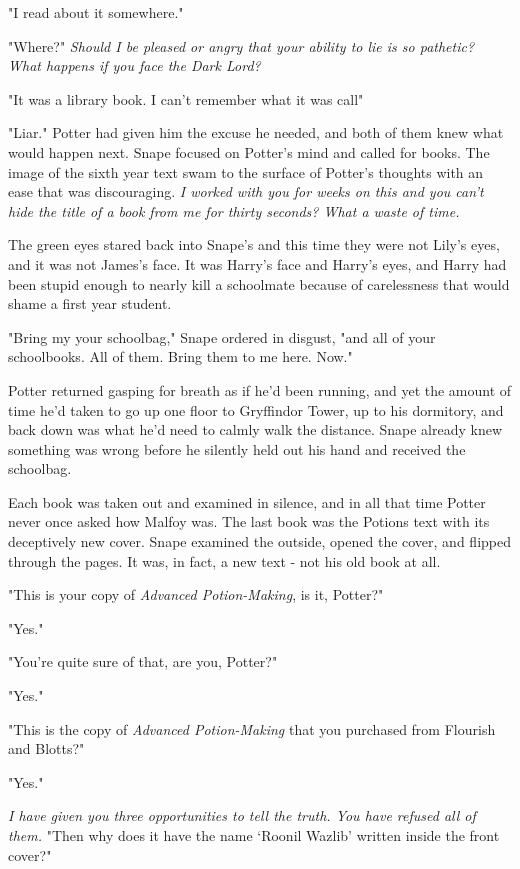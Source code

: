 "I{\el} read about it somewhere."

"Where?" \emph{Should I be pleased or angry that your ability to lie is so pathetic? What happens if you face the Dark Lord?}

"It was{\el} a library book. I can't remember what it was call{\el}"

"Liar." Potter had given him the excuse he needed, and both of them knew what would happen next. Snape focused on Potter's mind and called for books. The image of the sixth year text swam to the surface of Potter's thoughts with an ease that was discouraging. \emph{I worked with you for weeks on this and you can't hide the title of a book from me for thirty seconds? What a waste of time.}

The green eyes stared back into Snape's and this time they were not Lily's eyes, and it was not James's face. It was Harry's face and Harry's eyes, and Harry had been stupid enough to nearly kill a schoolmate because of carelessness that would shame a first year student.

"Bring my your schoolbag," Snape ordered in disgust, "and all of your schoolbooks. All of them. Bring them to me here. Now."

Potter returned gasping for breath as if he'd been running, and yet the amount of time he'd taken to go up one floor to Gryffindor Tower, up to his dormitory, and back down was what he'd need to calmly walk the distance. Snape already knew something was wrong before he silently held out his hand and received the schoolbag.

Each book was taken out and examined in silence, and in all that time Potter never once asked how Malfoy was. The last book was the Potions text with its deceptively new cover. Snape examined the outside, opened the cover, and flipped through the pages. It was, in fact, a new text - not his old book at all.

"This is your copy of \emph{Advanced Potion-Making}, is it, Potter?"

"Yes."

"You're quite sure of that, are you, Potter?"

"Yes."

"This is the copy of \emph{Advanced Potion-Making} that you purchased from Flourish and Blotts?"

"Yes."

\emph{I have given you three opportunities to tell the truth. You have refused all of them.} "Then why does it have the name `Roonil Wazlib' written inside the front cover?"

